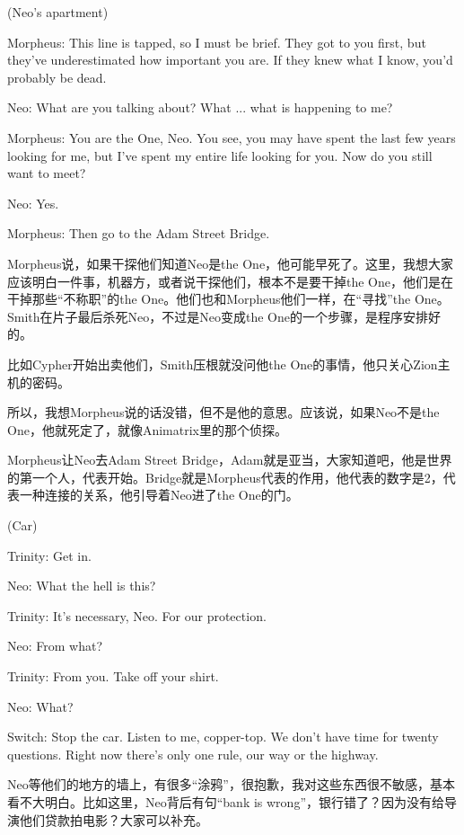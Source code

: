 \documentclass[UTF8]{ctexart}
\newenvironment{myquote}{\color{green} \setlength{\leftskip}{6em} \setlength{\rightskip}{4em} \setlength{\parindent}{-2em}}{\par}
\begin{document}
\begin{myquote}
(Neo's apartment)

Morpheus: This line is tapped, so I must be brief. They got to you first, but they've underestimated how important you are. If they knew what I know, you'd probably be dead.

Neo: What are you talking about? What ... what is happening to me?

Morpheus: You are the One, Neo. You see, you may have spent the last few years looking for me, but I've spent my entire life looking for you. Now do you still want to meet?

Neo: Yes.

Morpheus: Then go to the Adam Street Bridge.
\end{myquote}

Morpheus说，如果干探他们知道Neo是the One，他可能早死了。这里，我想大家应该明白一件事，机器方，或者说干探他们，根本不是要干掉the One，他们是在干掉那些“不称职”的the One。他们也和Morpheus他们一样，在“寻找”the One。Smith在片子最后杀死Neo，不过是Neo变成the One的一个步骤，是程序安排好的。

比如Cypher开始出卖他们，Smith压根就没问他the One的事情，他只关心Zion主机的密码。

所以，我想Morpheus说的话没错，但不是他的意思。应该说，如果Neo不是the One，他就死定了，就像Animatrix里的那个侦探。

Morpheus让Neo去Adam Street Bridge，Adam就是亚当，大家知道吧，他是世界的第一个人，代表开始。Bridge就是Morpheus代表的作用，他代表的数字是2，代表一种连接的关系，他引导着Neo进了the One的门。

\begin{myquote}
(Car)

Trinity: Get in.

Neo: What the hell is this?

Trinity: It's necessary, Neo. For our protection.

Neo: From what?

Trinity: From you. Take off your shirt.

Neo: What?

Switch: Stop the car. Listen to me, copper-top. We don't have time for twenty questions. Right now there's only one rule, our way or the highway.
\end{myquote}

Neo等他们的地方的墙上，有很多“涂鸦”，很抱歉，我对这些东西很不敏感，基本看不大明白。比如这里，Neo背后有句“bank is wrong”，银行错了？因为没有给导演他们贷款拍电影？大家可以补充。
\end{document}
